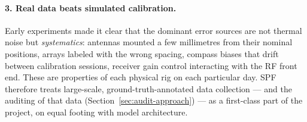 \paragraph{3. Real data beats simulated calibration.}
Early experiments made it clear that the dominant error sources are not
thermal noise but \emph{systematics}: antennas mounted a few millimetres from
their nominal positions, arrays labeled with the wrong spacing, compass biases
that drift between calibration sessions, receiver gain control interacting
with the RF front end. These are properties of each physical rig on each
particular day. SPF therefore treats large-scale, ground-truth-annotated data
collection --- and the auditing of that data
(Section~\ref{sec:audit-approach}) --- as a first-class part of the project,
on equal footing with model architecture.
